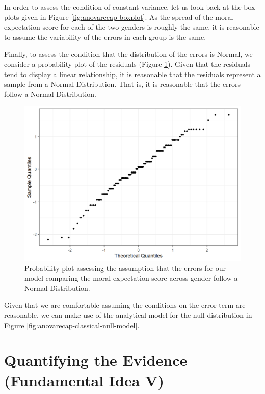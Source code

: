 \documentclass[
]{book}
\theoremstyle{plain}
\theoremstyle{mydefn}
\theoremstyle{myexmpl}
\theoremstyle{remark}
\begin{document}
In order to assess the condition of constant variance, let us look back at the box plots given in Figure \ref{fig:anovarecap-boxplot}. As the spread of the moral expectation score for each of the two genders is roughly the same, it is reasonable to assume the variability of the errors in each group is the same.

Finally, to assess the condition that the distribution of the errors is Normal, we consider a probability plot of the residuals (Figure \ref{fig:anovarecap-resids-probplot}). Given that the residuals tend to display a linear relationship, it is reasonable that the residuals represent a sample from a Normal Distribution. That is, it is reasonable that the errors follow a Normal Distribution.

\begin{figure}

{\centering \includegraphics[width=0.8\linewidth]{./Images/anovarecap-resids-probplot-1} 

}

\caption{Probability plot assessing the assumption that the errors for our model comparing the moral expectation score across gender follow a Normal Distribution.}\label{fig:anovarecap-resids-probplot}
\end{figure}

Given that we are comfortable assuming the conditions on the error term are reasonable, we can make use of the analytical model for the null distribution in Figure \ref{fig:anovarecap-classical-null-model}.

\hypertarget{quantifying-the-evidence-fundamental-idea-v-1}{%
\section{Quantifying the Evidence (Fundamental Idea V)}\label{quantifying-the-evidence-fundamental-idea-v-1}}
\end{document}

